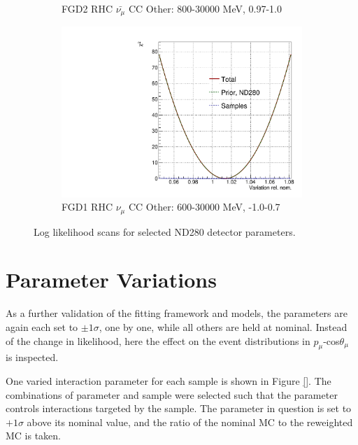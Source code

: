 \begin{figure}
\begin{subfigure}{.49\textwidth}
  \caption{FGD2 RHC $\bar{\nu_{\mu}}$ CC Other: 800-30000 MeV, 0.97-1.0}
\end{subfigure}
\begin{subfigure}{.49\textwidth}
  \centering
  \includegraphics[width=0.7\linewidth]{figs/llh/ndd_556_llh.pdf}
  \caption{FGD1 RHC $\nu_{\mu}$ CC Other: 600-30000 MeV, -1.0-0.7}
\end{subfigure}
\caption{Log likelihood scans for selected ND280 detector parameters.}
\label{fig:llhdet}
\end{figure}

\section{Parameter Variations}\label{sec:sigvar}

As a further validation of the fitting framework and models, the parameters are again each set to $\pm1\sigma$, one by one, while all others are held at nominal. Instead of the change in likelihood, here the effect on the event distributions in $p_{\mu}$-cos$\theta_{\mu}$ is inspected. 

One varied interaction parameter for each sample is shown in Figure \ref{}. The combinations of parameter and sample were selected such that the parameter controls interactions targeted by the sample. The parameter in question is set to $+1\sigma$ above its nominal value, and the ratio of the nominal MC to the reweighted MC is taken.

